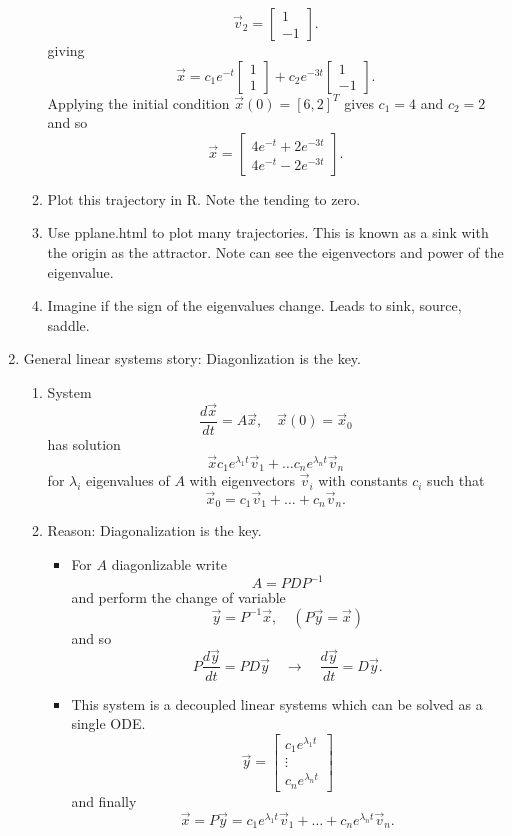 \documentclass{article}
\begin{document}
\begin{enumerate}
\begin{enumerate}
\[\vec{v}_2 = \left[ \begin{array}{c}
1 \\ -1
\end{array} \right].
\]
giving
\[
\vec{x} = c_1 e^{-t}  \left[ \begin{array}{c}
1 \\ 1
\end{array} \right]
+ c_2 e^{-3t}
\left[ \begin{array}{c}
1 \\ -1
\end{array} \right].
\]
Applying the initial condition $\vec{x}(0) = [6,2]^T$ gives $c_1=4$ and $c_2=2$ and so
\[
\vec{x} = \left[
\begin{array}{c}
4e^{-t}+2e^{-3t} \\
4e^{-t}-2e^{-3t} 
\end{array}
\right].
\]
\item Plot this trajectory in R. Note the tending to zero.
\item Use pplane.html to plot many trajectories. This is known as a sink with the origin as the attractor. Note can see the eigenvectors and power of the eigenvalue.
\item Imagine if the sign of the eigenvalues change. Leads to sink, source, saddle. 
\end{enumerate}


\item General linear systems story: Diagonlization is the key.
\begin{enumerate}
\item System
\[
\frac{d\vec{x}}{dt} = A\vec{x}, \quad \vec{x}(0) = \vec{x}_0
\]
has solution
\[
\vec{x} c_1 e^{\lambda_1 t} \vec{v}_1 + \dots c_n e^{\lambda_n t} \vec{v}_n
\]
for $\lambda_i$ eigenvalues of $A$ with eigenvectors $\vec{v}_i$  with constants $c_i$ such that 
\[
\vec{x}_0 = c_1 \vec{v}_1 + \dots + c_n \vec{v}_n.
\]
\item Reason: Diagonalization is the key.
\begin{itemize}
\item For $A$ diagonlizable write
\[
A = PDP^{-1}
\]
and perform the change of variable
\[
\vec{y} = P^{-1} \vec{x}, \quad (P\vec{y} = \vec{x})
\]
and so
\[
P \frac{d\vec{y}}{dt} = PD\vec{y} \quad \rightarrow \quad
\frac{d\vec{y}}{dt} = D\vec{y}.
\]
\item This system is a decoupled linear systems which can be solved as a single ODE.
\[
\vec{y} = \left[
\begin{array}{c}
c_1 e^{\lambda_1 t} \\ \vdots \\ c_n e^{\lambda_n t}
\end{array}
\right]
\]
and finally
\[
\vec{x} = P \vec{y} = c_1 e^{\lambda_1 t} \vec{v}_1 + \dots + c_n e^{\lambda_n t} \vec{v}_n.
\]
\end{itemize}
\end{enumerate}


\end{enumerate}
\end{document}

